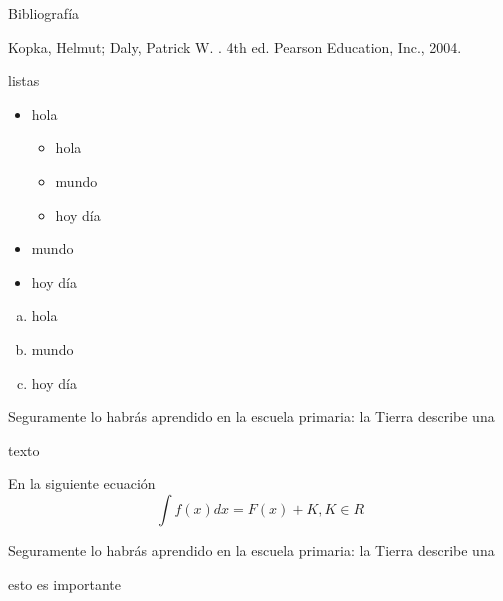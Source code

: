 \documentclass[utf8,spanish,xcolor={svgnames},14pt,handout]{beamer}
\begin{document}
\begin{frame}{Bibliografía}\transsplithorizontalout
\begin{thebibliography}{9}
	Kopka, Helmut; Daly, Patrick W.
	. 4th ed.
	\newblock Pearson Education, Inc., 2004.
\end{thebibliography}
\end{frame}

\begin{frame}{listas}\transdissolve
\begin{itemize}
	\item hola
	\begin{itemize}
		\item hola
		\item mundo
		\item hoy día
	\end{itemize}
    \item mundo
    \item hoy día
\end{itemize}

\begin{enumerate}[a)]
	\item hola
	\item mundo
	\item hoy día
\end{enumerate}

\begin{description}[MMMMMMMMMMMMMM]
	\item[hola] Seguramente lo habrás aprendido en la escuela primaria: la Tierra describe una
	
	\item[mundo] texto
\end{description}
\end{frame}


\begin{frame}\transsplithorizontalout
En la siguiente ecuación
\begin{equation}
\int f(x)dx =F(x)+K, K\in R
\end{equation}

Seguramente lo habrás aprendido en la \alert{escuela primaria}: la Tierra describe una

\begin{alertenv}
	esto es importante
\end{alertenv}

\end{frame}
\end{document}
